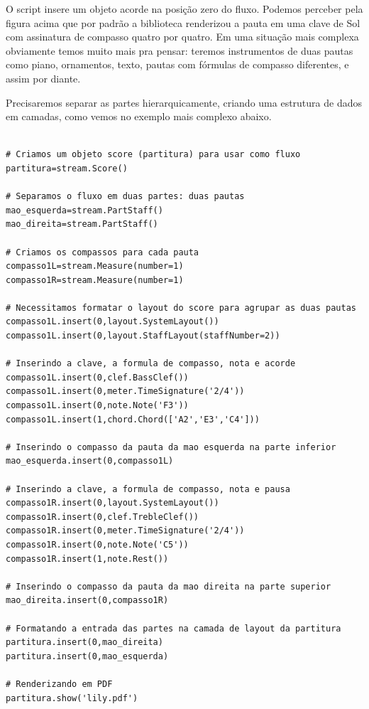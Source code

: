 \documentclass[
	12pt,				%
	openright,			%
	twoside,			%
	a4paper,			%
	english,			%
	french,				%
	spanish,			%
	brazil				%
	]{abntex2}
\begin{document}
O script insere um objeto acorde na posição zero do fluxo. Podemos perceber pela figura acima que por padrão a biblioteca renderizou a pauta em uma clave de Sol com assinatura de compasso quatro por quatro. Em uma situação mais complexa obviamente temos muito mais pra pensar: teremos instrumentos de duas pautas como piano, ornamentos, texto, pautas com fórmulas de compasso diferentes, e assim por diante.

Precisaremos separar as partes hierarquicamente, criando uma estrutura de dados em camadas, como vemos no exemplo mais complexo abaixo. 


\begin{lstlisting}

# Criamos um objeto score (partitura) para usar como fluxo
partitura=stream.Score()

# Separamos o fluxo em duas partes: duas pautas
mao_esquerda=stream.PartStaff()
mao_direita=stream.PartStaff()

# Criamos os compassos para cada pauta 
compasso1L=stream.Measure(number=1)
compasso1R=stream.Measure(number=1)

# Necessitamos formatar o layout do score para agrupar as duas pautas
compasso1L.insert(0,layout.SystemLayout())
compasso1L.insert(0,layout.StaffLayout(staffNumber=2))

# Inserindo a clave, a formula de compasso, nota e acorde
compasso1L.insert(0,clef.BassClef())
compasso1L.insert(0,meter.TimeSignature('2/4'))
compasso1L.insert(0,note.Note('F3'))
compasso1L.insert(1,chord.Chord(['A2','E3','C4']))

# Inserindo o compasso da pauta da mao esquerda na parte inferior
mao_esquerda.insert(0,compasso1L)

# Inserindo a clave, a formula de compasso, nota e pausa
compasso1R.insert(0,layout.SystemLayout())
compasso1R.insert(0,clef.TrebleClef())
compasso1R.insert(0,meter.TimeSignature('2/4'))
compasso1R.insert(0,note.Note('C5'))
compasso1R.insert(1,note.Rest())

# Inserindo o compasso da pauta da mao direita na parte superior
mao_direita.insert(0,compasso1R)

# Formatando a entrada das partes na camada de layout da partitura
partitura.insert(0,mao_direita)
partitura.insert(0,mao_esquerda)

# Renderizando em PDF
partitura.show('lily.pdf')
\end{lstlisting}
\end{document}
